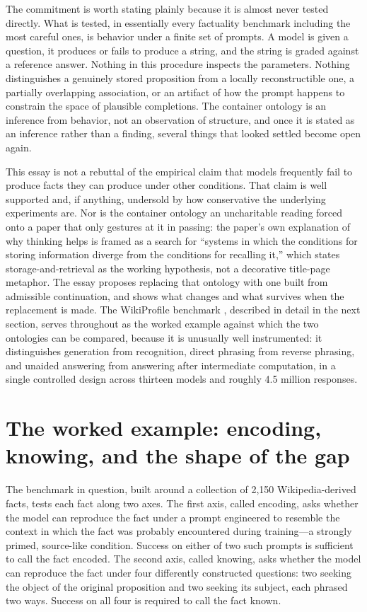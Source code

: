 \documentclass[11pt]{article}
\begin{document}
The commitment is worth stating plainly because it is almost never tested directly. What is tested, in essentially every factuality benchmark including the most careful ones, is behavior under a finite set of prompts. A model is given a question, it produces or fails to produce a string, and the string is graded against a reference answer. Nothing in this procedure inspects the parameters. Nothing distinguishes a genuinely stored proposition from a locally reconstructible one, a partially overlapping association, or an artifact of how the prompt happens to constrain the space of plausible completions. The container ontology is an inference from behavior, not an observation of structure, and once it is stated as an inference rather than a finding, several things that looked settled become open again.

This essay is not a rebuttal of the empirical claim that models frequently fail to produce facts they can produce under other conditions. That claim is well supported and, if anything, undersold by how conservative the underlying experiments are. Nor is the container ontology an uncharitable reading forced onto a paper that only gestures at it in passing: the paper's own explanation of why thinking helps is framed as a search for ``systems in which the conditions for storing information diverge from the conditions for recalling it,'' which states storage-and-retrieval as the working hypothesis, not a decorative title-page metaphor. The essay proposes replacing that ontology with one built from admissible continuation, and shows what changes and what survives when the replacement is made. The WikiProfile benchmark \cite{calderon2026}, described in detail in the next section, serves throughout as the worked example against which the two ontologies can be compared, because it is unusually well instrumented: it distinguishes generation from recognition, direct phrasing from reverse phrasing, and unaided answering from answering after intermediate computation, in a single controlled design across thirteen models and roughly 4.5 million responses.

\section{The worked example: encoding, knowing, and the shape of the gap}

The benchmark in question, built around a collection of 2,150 Wikipedia-derived facts, tests each fact along two axes. The first axis, called encoding, asks whether the model can reproduce the fact under a prompt engineered to resemble the context in which the fact was probably encountered during training---a strongly primed, source-like condition. Success on either of two such prompts is sufficient to call the fact encoded. The second axis, called knowing, asks whether the model can reproduce the fact under four differently constructed questions: two seeking the object of the original proposition and two seeking its subject, each phrased two ways. Success on all four is required to call the fact known.
\end{document}
